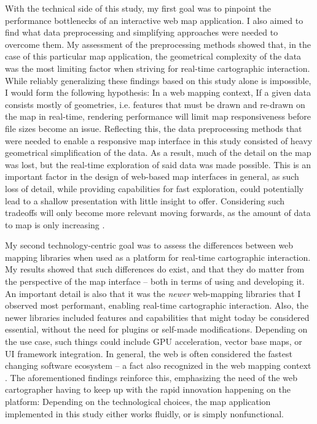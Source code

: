 With the technical side of this study, my first goal was to pinpoint
the performance bottlenecks of
an interactive web map application.
I also aimed to find what data preprocessing and simplifying approaches
were needed to overcome them.
My assessment of the preprocessing methods showed that, in the case of this particular
map application, the geometrical complexity of the data was the most limiting factor
when striving for real-time cartographic interaction.
While reliably generalizing these findings based on this study alone is impossible,
I would form the following hypothesis:
In a web mapping context, If a given data consists mostly of geometries, i.e.
features that must be drawn and re-drawn on the map in real-time,
rendering performance will limit map responsiveness before file sizes become an issue.
Reflecting this,
the data preprocessing methods that were needed
to enable a responsive map interface in this study
consisted of heavy geometrical simplification of the data.
As a result, much of the detail on the map was lost,
but the real-time exploration of said data was made possible.
This is an important factor in the design of
web-based map interfaces in general,
as such loss of detail, while providing capabilities for fast exploration,
could potentially lead to
a shallow presentation with little insight to offer.
Considering such tradeoffs will only become more relevant moving forwards,
as the amount of data to map is only increasing \parencite{kra2021, un2023}.

My second technology-centric goal was to assess
the differences between web mapping libraries
when used as a platform for real-time cartographic interaction.
My results showed that such differences do exist,
and that they do matter from the perspective of the map interface --
both in terms of using and developing it.
An important detail is also that
it was the \textit{newer} web-mapping libraries that I observed most performant,
enabling real-time cartographic interaction.
Also, the newer libraries included features and capabilities
that might today be considered essential,
without the need for plugins or self-made modifications.
Depending on the use case, such things could include GPU acceleration,
vector base maps, or UI framework integration.
In general, the web is often considered the fastest changing
software ecosystem \parencite{mik2019, tai2017} --
a fact also recognized in the web mapping context
\parencite{rot2014, vee2017}.
The aforementioned findings reinforce this, emphasizing the need of the web cartographer
having to keep up with the rapid innovation happening on the platform:
Depending on the technological choices, the map application implemented in this study
either works fluidly, or is simply nonfunctional.

